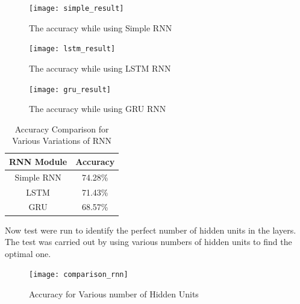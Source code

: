 \begin{figure}[H]
	\begin{center}
		
		\texttt{[image: simple\_result]}
		\caption{The accuracy while using Simple RNN}
	\end{center}
\end{figure}
\begin{figure}[H]
	\begin{center}
		
		\texttt{[image: lstm\_result]}
		\caption{The accuracy while using LSTM RNN}
	\end{center}
\end{figure}

\begin{figure}[H]
	\begin{center}
		
		\texttt{[image: gru\_result]}
		\caption{The accuracy while using GRU RNN}
	\end{center}
\end{figure}

\begin{center}
	\begin {table}[h]
	\begin{center}
		
		\begin{tabular}{ |c|c| } 
			\hline
			\textbf{RNN Module} & \textbf{Accuracy}  \\ 
			\hline
			Simple RNN & 74.28\%  \\ 
			\hline
			LSTM & 71.43\%  \\ 
			\hline
			GRU & 68.57\%  \\ 
			\hline			
		\end{tabular}
		\caption{Accuracy Comparison for Various Variations of RNN}
	\end{center}
\end{table}
\end{center}

Now test were run to identify the perfect number of hidden units in the layers. The test was carried out by using various numbers of hidden units to find the optimal one.

\begin{figure}[H]
	\begin{center}
		
		\texttt{[image: comparison\_rnn]}
		\caption{Accuracy for Various number of Hidden Units}
	\end{center}
\end{figure}

